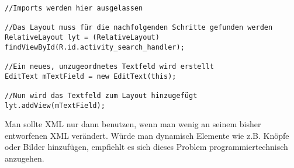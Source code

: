 \begin{lstlisting}
//Imports werden hier ausgelassen

//Das Layout muss für die nachfolgenden Schritte gefunden werden
RelativeLayout lyt = (RelativeLayout) findViewById(R.id.activity_search_handler);

//Ein neues, unzugeordnetes Textfeld wird erstellt
EditText mTextField = new EditText(this);

//Nun wird das Textfeld zum Layout hinzugefügt
lyt.addView(mTextField);
\end{lstlisting}

Man sollte XML nur dann benutzen, wenn man wenig an seinem bisher entworfenen XML verändert. Würde man dynamisch Elemente wie z.B. Knöpfe oder Bilder hinzufügen, empfiehlt es sich dieses Problem programmiertechnisch anzugehen.
